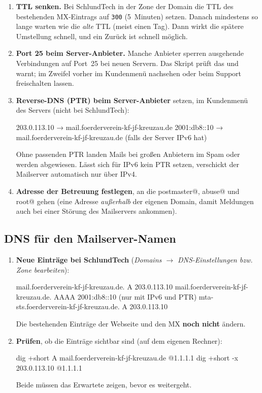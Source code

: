 \documentclass[a4paper,fontsize=10pt]{scrartcl}
\newcommand*{\cmd}[1]{\texttt{#1}}
\newcommand*{\erledigt}{\makebox[1.4em][l]{\setlength{\fboxsep}{0pt}\fbox{\rule{0pt}{0.7em}\hspace{0.7em}}}}
\begin{document}
\begin{enumerate}
  \item\label{ttl} \erledigt\textbf{TTL senken.} Bei SchlundTech in der Zone der Domain die
        TTL des bestehenden MX-Eintrags auf \cmd{300} (5~Minuten) setzen. Danach
        mindestens so lange warten wie die \emph{alte} TTL (meist einen Tag). Dann
        wirkt die spätere Umstellung schnell, und ein Zurück ist schnell möglich.
  \item \erledigt\textbf{Port 25 beim Server-Anbieter.} Manche Anbieter sperren ausgehende
        Verbindungen auf Port~25 bei neuen Servern. Das Skript prüft das und warnt;
        im Zweifel vorher im Kundenmenü nachsehen oder beim Support freischalten lassen.
  \item \erledigt\textbf{Reverse-DNS (PTR) beim Server-Anbieter} setzen, im Kundenmenü
        des Servers (nicht bei SchlundTech):
\begin{befehl}
203.0.113.10   →  mail.foerderverein-kf-jf-kreuzau.de
2001:db8::10   →  mail.foerderverein-kf-jf-kreuzau.de   (falls der Server IPv6 hat)
\end{befehl}
        Ohne passenden PTR landen Mails bei großen Anbietern im Spam oder werden
        abgewiesen. Lässt sich für IPv6 kein PTR setzen, verschickt der Mailserver
        automatisch nur über IPv4.
  \item \erledigt\textbf{Adresse der Betreuung festlegen}, an die postmaster@, abuse@ und
        root@ gehen (eine Adresse \emph{außerhalb} der eigenen Domain, damit Meldungen
        auch bei einer Störung des Mailservers ankommen).
\end{enumerate}

\subsection{DNS für den Mailserver-Namen}

\begin{enumerate}[resume]
  \item \erledigt\textbf{Neue Einträge bei SchlundTech} (\emph{Domains $\rightarrow$
        DNS-Einstellungen bzw. Zone bearbeiten}):
\begin{befehl}
mail.foerderverein-kf-jf-kreuzau.de.     A      203.0.113.10
mail.foerderverein-kf-jf-kreuzau.de.     AAAA   2001:db8::10     (nur mit IPv6 und PTR)
mta-sts.foerderverein-kf-jf-kreuzau.de.  A      203.0.113.10
\end{befehl}
        Die bestehenden Einträge der Webseite und den MX \textbf{noch nicht} ändern.
  \item \erledigt\textbf{Prüfen}, ob die Einträge sichtbar sind (auf dem eigenen Rechner):
\begin{befehl}
dig +short A mail.foerderverein-kf-jf-kreuzau.de @1.1.1.1
dig +short -x 203.0.113.10 @1.1.1.1
\end{befehl}
        Beide müssen das Erwartete zeigen, bevor es weitergeht.
\end{enumerate}
\end{document}

